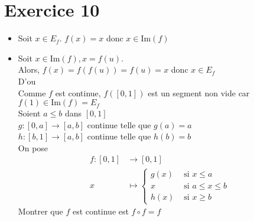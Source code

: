 \part{Exercice 10}

\begin{itemize}
	\item Soit $x \in E_f$.
		$f(x) = x$ donc $x \in \mathrm{Im}(f)$
	\item Soit $x \in \mathrm{Im}(f), x = f(u)$.\\
		Alors, $f(x) = f(f(u)) = f(u) = x$ donc $x \in  E_f$ \\
		D'ou \\
		Comme $f$ est continue, $f([0,1])$ est un segment non vide car $f(1) \in \mathrm{Im}(f) = E_f$ \\
		Soient $a \le b$ dans $[0,1]$ \\
		$g: [0,a] \to [a,b]$ continue telle que $g(a) = a$\\
		$h: [b,1] \to [a,b]$ continue telle que $h(b) = b$ \\
		On pose 
		\begin{align*}
			f: [0,1] &\longrightarrow [0,1] \\
			x &\longmapsto \begin{cases}
				g(x) &\text{ si } x\le a\\
				x &\text{ si } a \le x \le b\\
				h(x) &\text{ si } x \ge b
			\end{cases}
		\end{align*}
		Montrer que $f$ est continue est $f\circ f = f$
\end{itemize}
